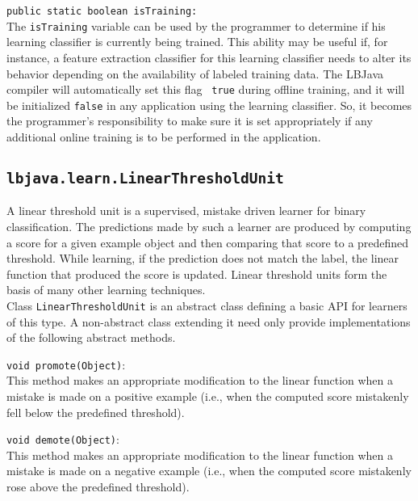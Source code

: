 \begin{list}{}{}
\item[{\tt public static boolean isTraining:}] ~\\
The {\tt isTraining} variable can be used by the programmer to determine if
his learning classifier is currently being trained.  This ability may be
useful if, for instance, a feature extraction classifier for this learning
classifier needs to alter its behavior depending on the availability of
labeled training data.  The LBJava compiler will automatically set this flag {\tt
true} during offline training, and it will be initialized {\tt false} in any
application using the learning classifier.  So, it becomes the programmer's
responsibility to make sure it is set appropriately if any additional online
training is to be performed in the application.
\end{list}

\subsection{{\tt lbjava.learn.LinearThresholdUnit}} \label{subsection:LTU}
A linear threshold unit is a supervised, mistake driven learner for binary
classification.  The predictions made by such a learner are produced by
computing a score for a given example object and then comparing that score to
a predefined threshold.  While learning, if the prediction does not match the
label, the linear function that produced the score is updated.  Linear
threshold units form the basis of many other learning techniques. \\

Class {\tt LinearThresholdUnit} is an abstract class defining a basic API for
learners of this type.  A non-abstract class extending it need only provide
implementations of the following abstract methods.

\begin{list}{}{}
\item[{\tt void promote(Object)}:] ~\\
This method makes an appropriate modification to the linear function
when a mistake is made on a positive example (i.e., when the computed score
mistakenly fell below the predefined threshold).

\item[{\tt void demote(Object)}:] ~\\
This method makes an appropriate modification to the linear function
when a mistake is made on a negative example (i.e., when the computed score
mistakenly rose above the predefined threshold).
\end{list}


